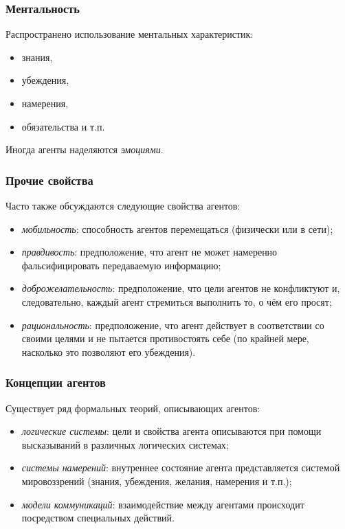 \documentclass{beamer}
\begin{document}
\begin{frame}
  \frametitle{Ментальность}
  Распространено использование ментальных характеристик:

  \begin{itemize}
    \item знания,
    \item убеждения,
    \item намерения,
    \item обязательства и т.п.
  \end{itemize}

  Иногда агенты наделяются {\it эмоциями}.
\end{frame}

\begin{frame}
  \frametitle{Прочие свойства}
  Часто также обсуждаются следующие свойства агентов:

  \begin{itemize}
    \item {\it мобильность}: способность агентов перемещаться (физически или в сети);
    \item {\it правдивость}: предположение, что агент не может намеренно фальсифицировать передаваемую информацию;
    \item {\it доброжелательность}: предположение, что цели агентов не конфликтуют и, следовательно, каждый агент
      стремиться выполнить то, о чём его просят;
    \item {\it рациональность}: предположение, что агент действует в соответствии со своими целями и не пытается
      противостоять себе (по крайней мере, насколько это позволяют его убеждения).
  \end{itemize}
\end{frame}

\begin{frame}
  \frametitle{Концепции агентов}
  Существует ряд формальных теорий, описывающих агентов:

  \begin{itemize}
    \item {\it логические системы}:
      цели и свойства агента описываются при помощи высказываний
      в различных логических системах;
    \item {\it системы намерений}:
      внутреннее состояние агента представляется системой
      мировоззрений (знания, убеждения, желания, намерения и т.п.);
    \item {\it модели коммуникаций}:
      взаимодействие между агентами происходит посредством специальных
      действий.
  \end{itemize}
\end{frame}
\end{document}
